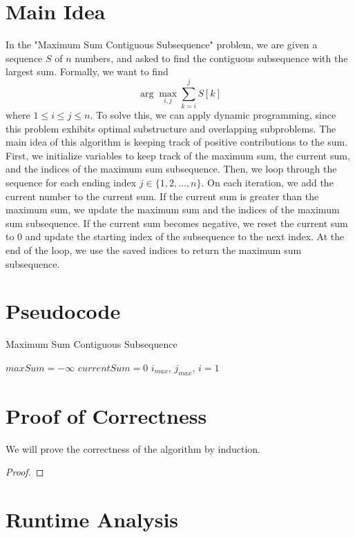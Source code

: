 \documentclass{article}
\begin{document}
\section{Main Idea}

In the "Maximum Sum Contiguous Subsequence" problem, we are given a sequence $S$ of $n$ numbers, and asked to find the contiguous subsequence with the largest sum.
Formally, we want to find $$\arg\max_{i, j} \sum_{k=i}^{j} S[k]$$ where $1 \leq i \leq j \leq n$.
To solve this, we can apply dynamic programming, since this problem exhibits optimal substructure and overlapping subproblems.
The main idea of this algorithm is keeping track of positive contributions to the sum.
First, we initialize variables to keep track of the maximum sum, the current sum, and the indices of the maximum sum subsequence.
Then, we loop through the sequence for each ending index $j \in \{1, 2, \ldots, n\}$.
On each iteration, we add the current number to the current sum.
If the current sum is greater than the maximum sum, we update the maximum sum and the indices of the maximum sum subsequence.
If the current sum becomes negative, we reset the current sum to 0 and update the starting index of the subsequence to the next index.
At the end of the loop, we use the saved indices to return the maximum sum subsequence.

\section{Pseudocode}

\begin{algorithm}[H]
\caption{Maximum Sum Contiguous Subsequence}
$maxSum = -\infty$\;
$currentSum = 0$\;
$i_{max}$, $j_{max}$, $i = 1$\;
\end{algorithm}

\section{Proof of Correctness}

We will prove the correctness of the algorithm by induction.

\begin{proof}

\end{proof}

\section{Runtime Analysis}
\end{document}
